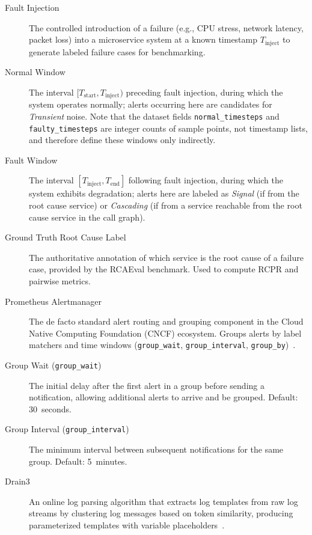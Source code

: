 \begin{description}
\item[Fault Injection]
The controlled introduction of a failure (e.g., CPU stress, network latency, packet loss) into a microservice system at a known timestamp $T_{\text{inject}}$ to generate labeled failure cases for benchmarking.

\item[Normal Window]
The interval $[T_{\text{start}}, T_{\text{inject}})$ preceding fault injection, during which the system operates normally; alerts occurring here are candidates for \textit{Transient} noise. Note that the dataset fields \texttt{normal\_timesteps} and \texttt{faulty\_timesteps} are integer counts of sample points, not timestamp lists, and therefore define these windows only indirectly.

\item[Fault Window]
The interval $[T_{\text{inject}}, T_{\text{end}}]$ following fault injection, during which the system exhibits degradation; alerts here are labeled as \textit{Signal} (if from the root cause service) or \textit{Cascading} (if from a service reachable from the root cause service in the call graph).

\item[Ground Truth Root Cause Label]
The authoritative annotation of which service is the root cause of a failure case, provided by the RCAEval benchmark. Used to compute RCPR and pairwise metrics.


\item[Prometheus Alertmanager]
The de facto standard alert routing and grouping component in the Cloud Native Computing Foundation (CNCF) ecosystem. Groups alerts by label matchers and time windows (\texttt{group\_wait}, \texttt{group\_interval}, \texttt{group\_by})~\cite{prometheus-alertmanager}.

\item[Group Wait (\texttt{group\_wait})]
The initial delay after the first alert in a group before sending a notification, allowing additional alerts to arrive and be grouped. Default: 30~seconds.

\item[Group Interval (\texttt{group\_interval})]
The minimum interval between subsequent notifications for the same group. Default: 5~minutes.

\item[Drain3]
An online log parsing algorithm that extracts log templates from raw log streams by clustering log messages based on token similarity, producing parameterized templates with variable placeholders~\cite{drain3}.


\end{description}
